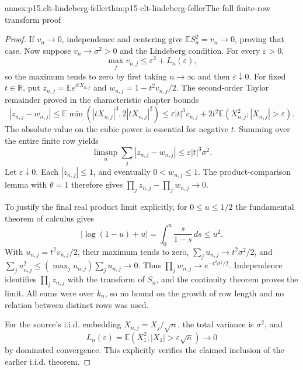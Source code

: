 \begin{annexitem}{annex:p15.clt-lindeberg-feller}{thm:p15-clt-lindeberg-feller}{The full finite-row transform proof}
\begin{proof}
If \(v_n\to0\), independence and centering give
\(\mathbb ES_n^2=v_n\to0\), proving that case.
Now suppose \(v_n\to\sigma^2>0\) and the Lindeberg condition.
For every \(\varepsilon>0\),
\[
 \max_jv_{n,j}
 \leq\varepsilon^2+L_n(\varepsilon),
 \]
so the maximum tends to zero by first taking \(n\to\infty\)
and then \(\varepsilon\downarrow0\).
For fixed \(t\in\mathbb R\), put
\(z_{n,j}=\mathbb Ee^{itX_{n,j}}\) and
\(w_{n,j}=1-t^2v_{n,j}/2\).
The second-order Taylor remainder proved in the characteristic
chapter bounds
\[
 |z_{n,j}-w_{n,j}|
 \leq\mathbb E\min(|tX_{n,j}|^3,2|tX_{n,j}|^2)
 \leq\varepsilon|t|^3v_{n,j}
       +2t^2\mathbb E(X_{n,j}^2;|X_{n,j}|>\varepsilon).
 \]
The absolute value on the cubic power is essential for negative \(t\).
Summing over the entire finite row yields
\[
 \limsup_n\sum_j|z_{n,j}-w_{n,j}|
 \leq\varepsilon|t|^3\sigma^2.
 \]
Let \(\varepsilon\downarrow0\).
Each \(|z_{n,j}|\leq1\), and eventually \(0<w_{n,j}\leq1\).
The product-comparison lemma with \(\theta=1\) therefore gives
\(\prod_jz_{n,j}-\prod_jw_{n,j}\to0\).

To justify the final real product limit explicitly, for \(0\leq u\leq1/2\)
the fundamental theorem of calculus gives
\[
 |\log(1-u)+u|
 =\int_0^u\frac{s}{1-s}\,ds\leq u^2.
 \]
With \(u_{n,j}=t^2v_{n,j}/2\), their maximum tends to zero,
\(\sum_ju_{n,j}\to t^2\sigma^2/2\), and
\(\sum_ju_{n,j}^2\leq(\max_ju_{n,j})\sum_ju_{n,j}\to0\).
Thus \(\prod_jw_{n,j}\to e^{-t^2\sigma^2/2}\).
Independence identifies \(\prod_jz_{n,j}\) with the transform
of \(S_n\), and the continuity theorem proves the limit.
All sums were over \(k_n\), so no bound on the growth of row length
and no relation between distinct rows was used.

For the source's i.i.d. embedding \(X_{n,j}=X_j/\sqrt n\),
the total variance is \(\sigma^2\), and
\[
 L_n(\varepsilon)
 =\mathbb E(X_1^2;|X_1|>\varepsilon\sqrt n)\to0
 \]
by dominated convergence. This explicitly verifies the claimed
inclusion of the earlier i.i.d. theorem.
\end{proof}
\end{annexitem}

